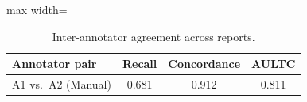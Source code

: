 \begin{table}[htbp]
\caption{Inter-annotator agreement across reports.}
\ChSixTableBodyStart
\begin{ChSixFloatBody}

\centering
\small


\begin{adjustbox}{max width=\columnwidth}
\begin{tabular}{lccc}
\toprule
Annotator pair & Recall & Concordance & AULTC \\
\midrule
A1 vs.\ A2 (Manual) & 0.681 & 0.912 & 0.811 \\
\bottomrule
\end{tabular}
\end{adjustbox}

\end{ChSixFloatBody}
\end{table}
